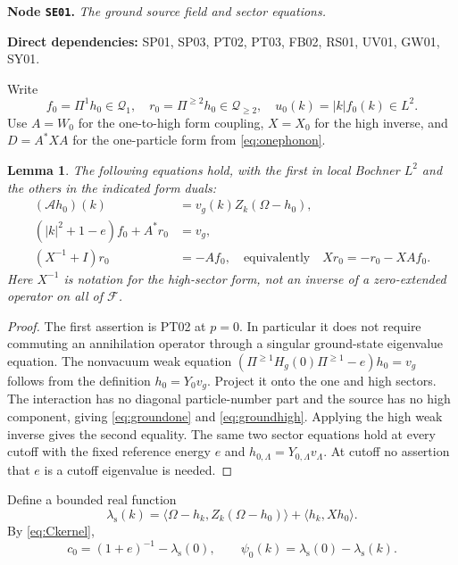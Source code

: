 \documentclass[11pt,a4paper]{article}
\newtheorem{lemma}[theorem]{Lemma}
\theoremstyle{remark}\newtheorem{remark}[theorem]{Remark}
\newcommand{\F}{\mathcal F}\newcommand{\Q}{\mathcal Q}\newcommand{\HH}{\mathcal H}
\newcommand{\ip}[2]{\langle #1,#2\rangle}\newcommand{\norm}[1]{\lVert #1\rVert}
\newcommand{\abs}[1]{\lvert #1\rvert}\newcommand{\rankone}[2]{\lvert #1\rangle\langle #2\rvert}
\newcommand{\node}[3]{\par\Needspace{6\baselineskip}\smallskip\hypertarget{node:#1}{}\label{nodepage:#1}\noindent\textbf{Node \texttt{#1}.} \textit{#2.}\par\noindent\textbf{Direct dependencies:} #3.\par}
\begin{document}
\node{SE01}{The ground source field and sector equations}{SP01, SP03, PT02, PT03, FB02, RS01, UV01, GW01, SY01}
Write
\[
 f_0=\Pi^1h_0\in\Q_1,\quad r_0=\Pi^{\geq2}h_0\in\Q_{\geq2},
 \quad u_0(k)=\abs k f_0(k)\in L^2.
\]
Use $A=W_0$ for the one-to-high form coupling, $X=X_0$ for the high inverse, and $D=A^*XA$ for the one-particle form from \eqref{eq:onephonon}.

\begin{lemma}\label{lem:groundPT}
The following equations hold, with the first in local Bochner $L^2$ and the others in the indicated form duals:
\begin{align}
 (\mathcal A h_0)(k)&=v_g(k)Z_k(\Omega-h_0),\label{eq:groundPT}\\
 (\abs k^2+1-e)f_0+A^*r_0&=v_g,\label{eq:groundone}\\
 (X^{-1}+I)r_0&=-Af_0,\quad\text{equivalently}\quad
 Xr_0=-r_0-XAf_0.\label{eq:groundhigh}
\end{align}
Here $X^{-1}$ is notation for the high-sector form, not an inverse of a zero-extended operator on all of $\F$.
\end{lemma}
\begin{proof}
The first assertion is PT02 at $p=0$. In particular it does not require commuting an annihilation operator through a singular ground-state eigenvalue equation. The nonvacuum weak equation
$(\Pi^{\geq1}H_g(0)\Pi^{\geq1}-e)h_0=v_g$
follows from the definition $h_0=Y_0v_g$. Project it onto the one and high sectors. The interaction has no diagonal particle-number part and the source has no high component, giving \eqref{eq:groundone} and \eqref{eq:groundhigh}. Applying the high weak inverse gives the second equality. The same two sector equations hold at every cutoff with the fixed reference energy $e$ and $h_{0,\Lambda}=Y_{0,\Lambda}v_\Lambda$. At cutoff no assertion that $e$ is a cutoff eigenvalue is needed.
\end{proof}

Define a bounded real function
\[
 \lambda_{\mathrm s}(k)=\ip{\Omega-h_k}{Z_k(\Omega-h_0)}+\ip{h_k}{Xh_0}.
\]
By \eqref{eq:Ckernel},
\begin{equation}
 c_0=(1+e)^{-1}-\lambda_{\mathrm s}(0),\qquad
 \psi_0(k)=\lambda_{\mathrm s}(0)-\lambda_{\mathrm s}(k).\label{eq:lambda}
\end{equation}
\end{document}
